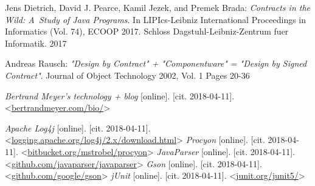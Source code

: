 \begin{thebibliography}{99}

 Jens Dietrich, David J. Pearce, Kamil Jezek, and Premek Brada:
\emph{Contracts in the Wild: A~Study of Java Programs}. In LIPIcs-Leibniz International Proceedings in Informatics (Vol. 74), ECOOP 2017. Schloss Dagstuhl-Leibniz-Zentrum fuer Informatik. 2017

 Andreas Rausch:
\emph{"Design by Contract" + "Componentware" = "Design by Signed Contract"}. Journal of Object Technology 2002, Vol. 1 Pages 20-36 

 {\it Bertrand Meyer's technology + blog} [online]. [cit. 2018-04-11]. \textless\url{bertrandmeyer.com/bio/}\textgreater



 {\it Apache Log4j} [online]. [cit. 2018-04-11]. \textless\url{logging.apache.org/log4j/2.x/download.html}\textgreater
{} {\it Procyon} [online]. [cit. 2018-04-11]. \textless\url{bitbucket.org/mstrobel/procyon}\textgreater
{} {\it JavaParser} [online]. [cit. 2018-04-11]. \textless\url{github.com/javaparser/javaparser}\textgreater
{} {\it Gson} [online]. [cit. 2018-04-11]. \textless\url{github.com/google/gson}\textgreater
{} {\it jUnit} [online]. [cit. 2018-04-11]. \textless\url{junit.org/junit5/}\textgreater


\end{thebibliography}

